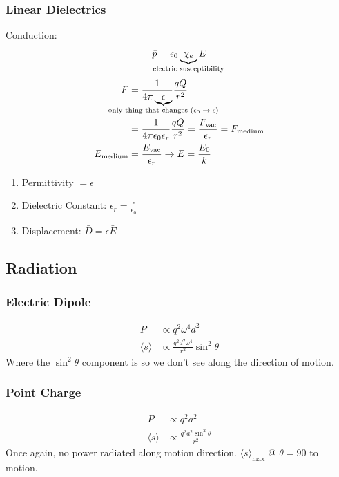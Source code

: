 \documentclass[10pt,a4paper]{article}
\begin{document}
\subsubsection{Linear Dielectrics}
Conduction:
\begin{equation}
 \bar{p} = \epsilon_0 \underbrace{\chi_e}_{\mathclap{\textrm{electric susceptibility}}} \bar{E}
\end{equation}
\begin{align}
 F &= \frac{1}{4 \pi \underbrace{\epsilon}_{\mathclap{\textrm{only thing that changes ($\epsilon_0 \rightarrow \epsilon$)}}}} \frac{qQ}{r^2}\\
 &= \frac{1}{4 \pi \epsilon_0 \epsilon_r} \frac{qQ}{r^2} = \frac{F_{\textrm{vac}}}{\epsilon_r} = F_{\textrm{medium}}\\
 E_{\textrm{medium}} &= \frac{E_{\textrm{vac}}}{\epsilon_r} \rightarrow E = \frac{E_0}{k}
\end{align}
\begin{enumerate}
    \item Permittivity $ = \epsilon$ 
    \item Dielectric Constant: $\epsilon_r = \frac{\epsilon}{\epsilon_0}$
    \item Displacement: $\bar{D} = \epsilon \bar{E}$
\end{enumerate}

\subsection{Radiation}
\subsubsection{Electric Dipole}
\begin{align}
 P &\propto q^2 \omega^4 d^2\\
\langle s \rangle &\propto \frac{q^2 d^2 \omega^4}{r^2}\sin^2\theta
\end{align}
Where the $\sin^2 \theta$ component is so we don't see along the direction of motion.

\subsubsection{Point Charge}
\begin{align}
 P &\propto q^2 a^2\\
 \langle s \rangle &\propto \frac{q^2 a^2  \sin^2\theta}{r^2}
\end{align}
Once again, no power radiated along motion direction. $\langle s \rangle_{\textrm{max}}$ @ $ \theta = 90$ to motion.
\end{document}
